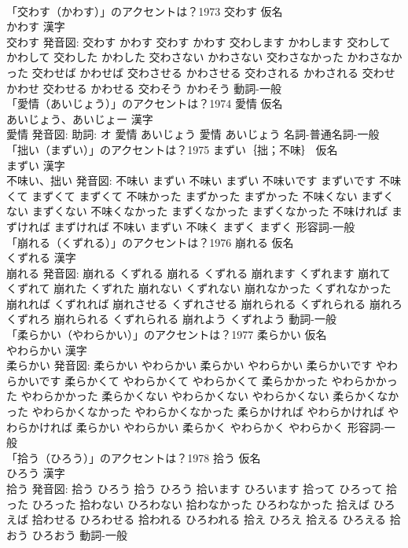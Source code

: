 \documentclass[8pt]{extreport}
\begin{document}
\begin{CJK}{UTF8}{min}
\\	「交わす（かわす）」のアクセントは？1973	交わす 仮名　
\\	かわす 漢字　
\\	交わす 発音図:	交わす かわす		交わす かわす 交わします かわします 交わして かわして 交わした かわした 交わさない かわさない 交わさなかった かわさなかった 交わせば かわせば 交わさせる かわさせる 交わされる かわされる 交わせ かわせ 交わせる かわせる 交わそう かわそう				動詞-一般 
\\	「愛情（あいじょう）」のアクセントは？1974	愛情 仮名　
\\	あいじょう、あいじょー 漢字　
\\	愛情 発音図: 助詞: オ	愛情 あいじょう		愛情 あいじょう				名詞-普通名詞-一般 
\\	「拙い（まずい）」のアクセントは？1975	まずい｛拙；不味｝ 仮名　
\\	まずい 漢字　
\\	不味い、拙い 発音図:	不味い まずい		不味い まずい 不味いです まずいです 不味くて まずくて まずくて 不味かった まずかった まずかった 不味くない まずくない まずくない 不味くなかった まずくなかった まずくなかった 不味ければ まずければ まずければ 不味い まずい 不味く まずく まずく				形容詞-一般 
\\	「崩れる（くずれる）」のアクセントは？1976	崩れる 仮名　
\\	くずれる 漢字　
\\	崩れる 発音図:	崩れる くずれる		崩れる くずれる 崩れます くずれます 崩れて くずれて 崩れた くずれた 崩れない くずれない 崩れなかった くずれなかった 崩れれば くずれれば 崩れさせる くずれさせる 崩れられる くずれられる 崩れろ くずれろ 崩れられる くずれられる 崩れよう くずれよう				動詞-一般 
\\	「柔らかい（やわらかい）」のアクセントは？1977	柔らかい 仮名　
\\	やわらかい 漢字　
\\	柔らかい 発音図:	柔らかい やわらかい		柔らかい やわらかい 柔らかいです やわらかいです 柔らかくて やわらかくて やわらかくて 柔らかかった やわらかかった やわらかかった 柔らかくない やわらかくない やわらかくない 柔らかくなかった やわらかくなかった やわらかくなかった 柔らかければ やわらかければ やわらかければ 柔らかい やわらかい 柔らかく やわらかく やわらかく				形容詞-一般 
\\	「拾う（ひろう）」のアクセントは？1978	拾う 仮名　
\\	ひろう 漢字　
\\	拾う 発音図:	拾う ひろう		拾う ひろう 拾います ひろいます 拾って ひろって 拾った ひろった 拾わない ひろわない 拾わなかった ひろわなかった 拾えば ひろえば 拾わせる ひろわせる 拾われる ひろわれる 拾え ひろえ 拾える ひろえる 拾おう ひろおう				動詞-一般 

\end{CJK}
\end{document}
